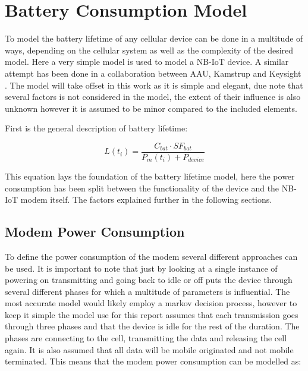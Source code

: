 \section{Battery Consumption Model}
\label{app:bat_model}

To model the battery lifetime of any cellular device can be done in a multitude of ways, depending on the cellular system as well as the complexity of the desired model. Here a very simple model is used to model a NB-IoT device. A similar attempt has been done in a collaboration between AAU, Kamstrup and Keysight \citep{Power_article}. The model will take offset in this work as it is simple and elegant, due note that several factors is not considered in the model, the extent of their influence is also unknown however it is assumed to be minor compared to the included elements.

First is the general description of battery lifetime:

\begin{equation}
L(t_i) = \frac{C_{bat}\cdot SF_{bat}}{P_m(t_i) + P_{device}}
\end{equation}
\begin{where}
\end{where}

This equation lays the foundation of the battery lifetime model, here the power consumption has been split between the functionality of the device and the NB-IoT modem itself. The factors explained further in the following sections.

\subsection{Modem Power Consumption}

To define the power consumption of the modem several different approaches can be used. It is important to note that just by looking at a single instance of powering on transmitting and going back to idle or off puts the device through several different phases for which a multitude of parameters is influential. The most accurate model would likely employ a markov decision process, however to keep it simple the model use for this report assumes that each transmission goes through three phases and that the device is idle for the rest of the duration. The phases are connecting to the cell, transmitting the data and releasing the cell again. It is also assumed that all data will be mobile originated and not mobile terminated. This means that the modem power consumption can be modelled as:

